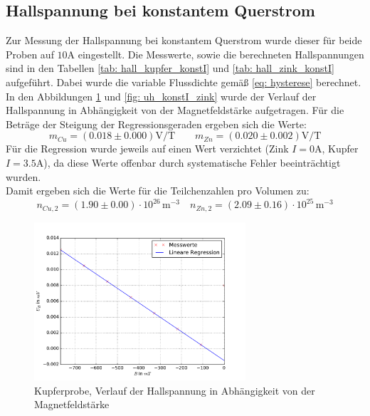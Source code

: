 \subsection{Hallspannung bei konstantem Querstrom}
Zur Messung der Hallspannung bei konstantem Querstrom wurde dieser für beide Proben auf $10\si{\ampere}$ eingestellt. Die
Messwerte, sowie die berechneten Hallspannungen sind in den Tabellen \ref{tab: hall_kupfer_konstI} und \ref{tab: hall_zink_konstI} aufgeführt. Dabei wurde
die variable Flussdichte gemäß \eqref{eq: hysterese} berechnet. In den Abbildungen \ref{fig: uh_konstI_kupfer} und \ref{fig: uh_konstI_zink}
wurde der Verlauf der Hallspannung in Abhängigkeit von der Magnetfeldstärke aufgetragen. Für die Beträge der Steigung der Regressionsgeraden
ergeben sich die Werte:
\begin{equation}
  m_{Cu} = (0.018 \pm 0.000)\si{\volt \per \tesla }  \quad \quad m_{Zn} = (0.020 \pm 0.002)\si{\volt \per \tesla}
\end{equation}
Für die Regression wurde jeweils auf einen Wert verzichtet (Zink $I = 0 \si{\ampere}$, Kupfer $I = 3.5\si{\ampere}$), da diese Werte offenbar
durch systematische Fehler beeinträchtigt wurden.\\
Damit ergeben sich die Werte für die Teilchenzahlen pro Volumen zu:
\begin{equation}
  n_{Cu,2} = (1.90 \pm 0.00)\cdot 10^{26}\,\si{ \meter^{-3}} \quad n_{Zn,2} = (2.09\pm 0.16)\cdot 10^{25}\,\si{ \meter^{-3}}
\end{equation}


\begin{figure}
  \centering
  \includegraphics[width=0.7\textwidth]{pics/u_h_kupfer_konstI.pdf}
  \caption{Kupferprobe, Verlauf der Hallspannung in Abhängigkeit von der Magnetfeldstärke}
  \label{fig: uh_konstI_kupfer}
\end{figure}
